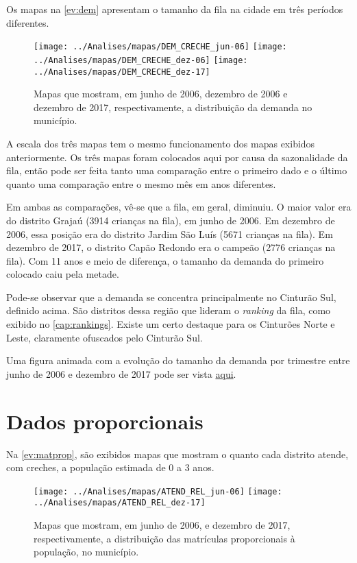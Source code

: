 Os mapas na \autoref{ev:dem} apresentam o tamanho da fila na cidade em três períodos diferentes.

\begin{figure}[H]
	\centering
	\texttt{[image: ../Analises/mapas/DEM\_CRECHE\_jun-06]}
	\texttt{[image: ../Analises/mapas/DEM\_CRECHE\_dez-06]}
	\texttt{[image: ../Analises/mapas/DEM\_CRECHE\_dez-17]}
	\caption{Mapas que mostram, em junho de 2006, dezembro de 2006 e dezembro de 2017, respectivamente, a distribuição da demanda no município.}
	\label{ev:dem}
\end{figure}

A escala dos três mapas tem o mesmo funcionamento dos mapas exibidos anteriormente. Os três mapas foram colocados aqui por causa da sazonalidade da fila, então pode ser feita tanto uma comparação entre o primeiro dado e o último quanto uma comparação entre o mesmo mês em anos diferentes.

Em ambas as comparações, vê-se que a fila, em geral, diminuiu. O maior valor era do distrito Grajaú (3914 crianças na fila), em junho de 2006. Em dezembro de 2006, essa posição era do distrito Jardim São Luís (5671 crianças na fila). Em dezembro de 2017, o distrito Capão Redondo era o campeão (2776 crianças na fila). Com 11 anos e meio de diferença, o tamanho da demanda do primeiro colocado caiu pela metade.

Pode-se observar que a demanda se concentra principalmente no Cinturão Sul, definido acima. São distritos dessa região que lideram o \textit{ranking} da fila, como exibido no \autoref{cap:rankings}. Existe um certo destaque para os Cinturões Norte e Leste, claramente ofuscados pelo Cinturão Sul.

Uma figura animada com a evolução do tamanho da demanda por trimestre entre junho de 2006 e dezembro de 2017 pode ser vista \href{https://lsflp.github.io/MAC0213/multimidia/DEM_CRECHE.gif}{aqui}.

\section{Dados proporcionais}

Na \autoref{ev:matprop}, são exibidos mapas que mostram o quanto cada distrito atende, com creches, a população estimada de 0 a 3 anos.

\begin{figure}[H]
	\centering
	\texttt{[image: ../Analises/mapas/ATEND\_REL\_jun-06]}
	\texttt{[image: ../Analises/mapas/ATEND\_REL\_dez-17]}
	\caption{Mapas que mostram, em junho de 2006, e dezembro de 2017, respectivamente, a distribuição das matrículas proporcionais à população, no município.}
	\label{ev:matprop}
\end{figure}

